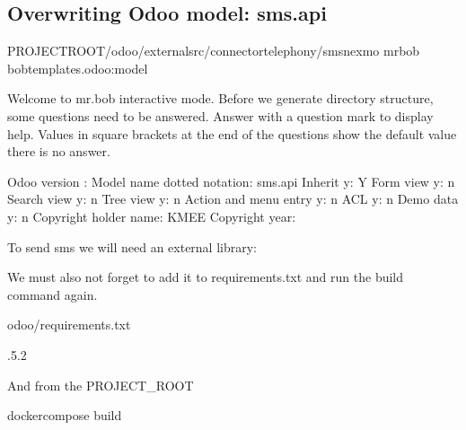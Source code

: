 \documentclass[letterpaper,10pt,english]{sphinxmanual}
\begin{document}
\subsection{Overwriting Odoo model: sms.api}
\label{\detokenize{technical:overwriting-odoo-model-sms-api}}
\begin{sphinxVerbatim}[commandchars=\\\{\}]
 PROJECT\PYGZus{}ROOT/odoo/external\PYGZhy{}src/connector\PYGZhy{}telephony/sms\PYGZus{}nexmo
mrbob bobtemplates.odoo:model

Welcome to mr.bob interactive mode. Before we generate directory structure,
some questions need to be answered. Answer with a question mark to display help.
Values in square brackets at the end of the questions show the
default value  there is no answer.

    \PYGZhy{}\PYGZhy{}\PYGZgt{} Odoo version  \PYG{o}{[}\PYG{o}{]}: 
    \PYGZhy{}\PYGZhy{}\PYGZgt{} Model name dotted notation: sms.api
    \PYGZhy{}\PYGZhy{}\PYGZgt{} Inherit \PYG{o}{[}y\PYG{o}{]}: Y
    \PYGZhy{}\PYGZhy{}\PYGZgt{} Form view \PYG{o}{[}y\PYG{o}{]}: n
    \PYGZhy{}\PYGZhy{}\PYGZgt{} Search view \PYG{o}{[}y\PYG{o}{]}: n
    \PYGZhy{}\PYGZhy{}\PYGZgt{} Tree view \PYG{o}{[}y\PYG{o}{]}: n
    \PYGZhy{}\PYGZhy{}\PYGZgt{} Action and menu entry \PYG{o}{[}y\PYG{o}{]}: n
    \PYGZhy{}\PYGZhy{}\PYGZgt{} ACL \PYG{o}{[}y\PYG{o}{]}: n
    \PYGZhy{}\PYGZhy{}\PYGZgt{} Demo data \PYG{o}{[}y\PYG{o}{]}: n
    \PYGZhy{}\PYGZhy{}\PYGZgt{} Copyright holder name: KMEE
    \PYGZhy{}\PYGZhy{}\PYGZgt{} Copyright year: 
\end{sphinxVerbatim}

To send sms we will need an external library: 

We must also not forget to add it to requirements.txt and run the build command again.

odoo/requirements.txt

\begin{sphinxVerbatim}[commandchars=\\\{\}]
.5.2
\end{sphinxVerbatim}

And from the PROJECT\_ROOT

\begin{sphinxVerbatim}[commandchars=\\\{\}]
docker\PYGZhy{}compose build
\end{sphinxVerbatim}
\end{document}
